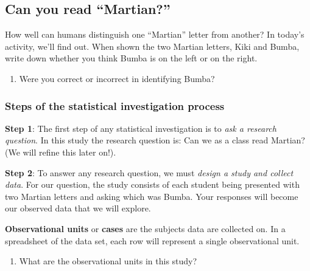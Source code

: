 \documentclass[
]{report}
\providecommand{\tightlist}{%
  \setlength{\itemsep}{0pt}\setlength{\parskip}{0pt}}
\begin{document}
\hypertarget{can-you-read-martian}{%
\subsection{Can you read ``Martian?''}\label{can-you-read-martian}}

How well can humans distinguish one ``Martian'' letter from another? In today's activity, we'll find out. When shown the two Martian letters, Kiki and Bumba, write down whether you think Bumba is on the left or on the right.
\vspace{2mm}

\begin{enumerate}
\def\labelenumi{\arabic{enumi}.}
\tightlist
\item
  Were you correct or incorrect in identifying Bumba?
\end{enumerate}

\vspace{1mm}

\hypertarget{steps-of-the-statistical-investigation-process}{%
\subsubsection*{Steps of the statistical investigation process}\label{steps-of-the-statistical-investigation-process}}

\textbf{Step 1}: The first step of any statistical investigation is to \emph{ask a research question}. In this study the research question is: Can we as a class read Martian? (We will refine this later on!).

\textbf{Step 2}: To answer any research question, we must \emph{design a study and collect data}. For our question, the study consists of each student being presented with two Martian letters and asking which was Bumba. Your responses will become our observed data that we will explore.

\textbf{Observational units} or \textbf{cases} are the subjects data are collected on. In a spreadsheet of the data set, each row will represent a single observational unit.

\begin{enumerate}
\def\labelenumi{\arabic{enumi}.}
\setcounter{enumi}{1}
\tightlist
\item
  What are the observational units in this study?
\end{enumerate}

\vspace{0.2in}
\end{document}
